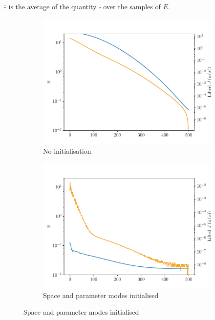 $\overline{\square}$ is the average of the quantity $\square$ over the samples of $E$.

\begin{figure}
    \begin{subfigure}[t]{0.5\linewidth}
        \centering
        \includegraphics[width=\linewidth]{Figures/ParaError_NoInit.pdf}
        \caption{No initialisation}
    \end{subfigure}
    \begin{subfigure}[t]{0.5\linewidth}
        \centering
        \includegraphics[width=\linewidth]{Figures/ParaError_full_initialised.pdf}
        \caption{Space and parameter modes initialised}
    \end{subfigure}

\end{figure}
